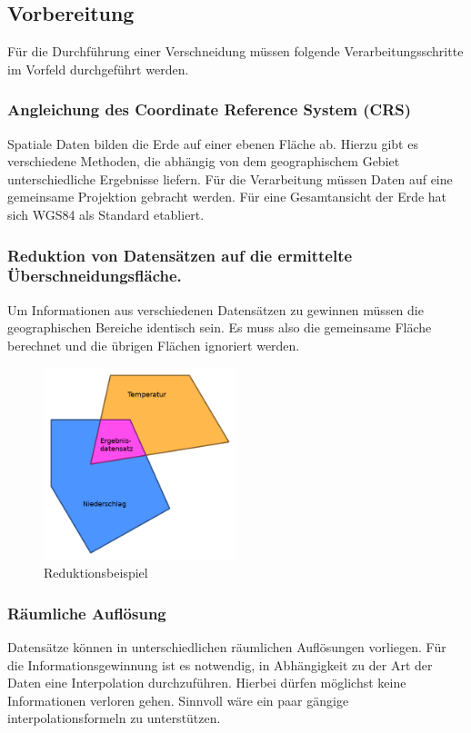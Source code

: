 \subsection{Vorbereitung}
Für die Durchführung einer Verschneidung müssen folgende Verarbeitungsschritte im Vorfeld durchgeführt werden.

\subsubsection{Angleichung des Coordinate Reference System (CRS)}
Spatiale Daten bilden die Erde auf einer ebenen Fläche ab. Hierzu gibt es verschiedene Methoden, die abhängig von dem geographischem Gebiet unterschiedliche Ergebnisse liefern. Für die Verarbeitung müssen Daten auf eine gemeinsame Projektion gebracht werden. Für eine Gesamtansicht der Erde hat sich WGS84 als Standard etabliert.

\subsubsection{Reduktion von Datensätzen auf die ermittelte Überschneidungsfläche.}
Um Informationen aus verschiedenen Datensätzen zu gewinnen müssen die geographischen Bereiche identisch sein. Es muss also die gemeinsame Fläche berechnet und die übrigen Flächen ignoriert werden.
\begin{figure}[H]
	\centering\includegraphics[width=0.5\textwidth]{res/Reduktionsbeispiel}
	\caption{Reduktionsbeispiel}
	\label{fig:Reduktionsbeispiel}
\end{figure}

\subsubsection{Räumliche Auflösung}
Datensätze können in unterschiedlichen räumlichen Auflösungen vorliegen. Für die Informationsgewinnung ist es notwendig, in Abhängigkeit zu der Art der Daten eine Interpolation durchzuführen. Hierbei dürfen möglichst keine Informationen verloren gehen. Sinnvoll wäre ein paar gängige interpolationsformeln zu unterstützen.


